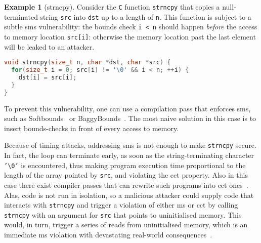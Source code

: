 \documentclass[dvipsnames,conference]{IEEEtran}
\theoremstyle{definition}
\newtheorem{exampleenv}{Example}[section]
\begin{document}
\begin{exampleenv}[strncpy]\label{ex:strncpy}
Consider the \texttt{C} function \texttt{strncpy} that copies a null-terminated string \texttt{src} into \texttt{dst} up to a length of \texttt{n}.
This function is subject to a subtle \gls*{sms} vulnerability: the bounds check \texttt{i < n} should happen {\it before} the access to memory location \texttt{src[i]}: otherwise
the memory location past the last element will be leaked to an attacker.
\begin{lstlisting}[language=c,basicstyle=\small\ttfamily,morekeywords={size_t}]
void strncpy(size_t n, char *dst, char *src) {
  for(size_t i = 0; src[i] != '\0' && i < n; ++i) {
    dst[i] = src[i];
  }
}
\end{lstlisting}

To prevent this vulnerability, one can use a compilation pass that enforces \gls*{sms}, such as Softbounds~\cite{nagarakatte2009soft} or BaggyBounds~\cite{akritidis2009baggy}.
The most naive solution in this case is to insert bounds-checks in front of every access to memory.

Because of timing attacks, addressing \gls*{sms} is not enough to make \texttt{strncpy} secure.
In fact, the loop can terminate early, as soon as the string-terminating character \texttt{'\textbackslash 0'} is encountered, thus making program execution time proportional to the length of the array pointed by \texttt{src}, and violating the \gls*{cct} property.
Also in this case there exist compiler passes that can rewrite such programs into \gls*{cct} ones~\cite{cauligi2019fact}.
%
Alas, code is not run in isolation, so a malicious attacker could supply code that interacts with \texttt{strncpy} and trigger a violation of either \gls*{ms} or \gls*{cct} by calling \texttt{strncpy} with an argument for \texttt{src} that points to uninitialised memory.
This would, in turn, trigger a series of reads from uninitialised memory, which is an immediate \gls*{ms} violation with devastating real-world consequences~\cite{uninit-0,uninit-1,uninit-2,uninit-3,uninit-4}.
\end{exampleenv}
\end{document}
